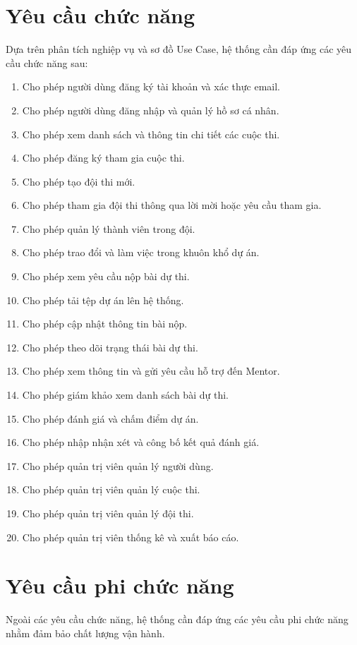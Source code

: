 	\section{Yêu cầu chức năng}
	
	Dựa trên phân tích nghiệp vụ và sơ đồ Use Case, hệ thống cần đáp ứng các yêu cầu chức năng sau:
	
	\begin{enumerate}
		\item Cho phép người dùng đăng ký tài khoản và xác thực email.
		\item Cho phép người dùng đăng nhập và quản lý hồ sơ cá nhân.
		\item Cho phép xem danh sách và thông tin chi tiết các cuộc thi.
		\item Cho phép đăng ký tham gia cuộc thi.
		\item Cho phép tạo đội thi mới.
		\item Cho phép tham gia đội thi thông qua lời mời hoặc yêu cầu tham gia.
		\item Cho phép quản lý thành viên trong đội.
		\item Cho phép trao đổi và làm việc trong khuôn khổ dự án.
		\item Cho phép xem yêu cầu nộp bài dự thi.
		\item Cho phép tải tệp dự án lên hệ thống.
		\item Cho phép cập nhật thông tin bài nộp.
		\item Cho phép theo dõi trạng thái bài dự thi.
		\item Cho phép xem thông tin và gửi yêu cầu hỗ trợ đến Mentor.
		\item Cho phép giám khảo xem danh sách bài dự thi.
		\item Cho phép đánh giá và chấm điểm dự án.
		\item Cho phép nhập nhận xét và công bố kết quả đánh giá.
		\item Cho phép quản trị viên quản lý người dùng.
		\item Cho phép quản trị viên quản lý cuộc thi.
		\item Cho phép quản trị viên quản lý đội thi.
		\item Cho phép quản trị viên thống kê và xuất báo cáo.
	\end{enumerate}
	\section{Yêu cầu phi chức năng}
	
	Ngoài các yêu cầu chức năng, hệ thống cần đáp ứng các yêu cầu phi chức năng nhằm đảm bảo chất lượng vận hành.
	
